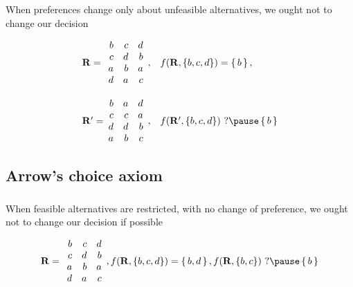 \documentclass[french,english]{beamer}
\begin{document}
\begin{frame}[fragile]
	\frametitle{\subsecname}
	\begin{definition}[\subsecname]
		When preferences change only about unfeasible alternatives, we ought not to change our decision
	\end{definition}
	\vspace{-1.8pt}
	\begin{example}
		\begin{equation}
			\begin{array}{l@{\hskip 0in}ll}
				\prof =
				&\begin{array}{rrr}
					b	&	c	&	d\\
					c	&	d	&	b\\
					a	&	b	&	a\\
					d	&	a	&	c
				\end{array},
				& f(\prof, \{b, c, d\}) = \set{b},\\[3em]
				\prof' =
				&\begin{array}{rrr}
					b	&	a	&	d\\
					c	&	c	&	a\\
					d	&	d	&	b\\
					a	&	b	&	c
				\end{array},
				& f(\prof', \{b, c, d\})\text{ ?}
				\pause
				\set{b}
			\end{array}
		\end{equation}
	\end{example}
\end{frame}

\subsection[ACA]{Arrow’s choice axiom}
\begin{frame}
	\frametitle{\subsecname}
	\begin{definition}[\subsecname]
		When feasible alternatives are restricted, with no change of preference, we ought not to change our decision if possible
	\end{definition}
	\vspace{-1.8pt}
	\begin{example}
		\begin{equation}
			\prof =
			\begin{array}{rrr}
				b	&	c	&	d\\
				c	&	d	&	b\\
				a	&	b	&	a\\
				d	&	a	&	c
			\end{array},
			f(\prof, \{b, c, d\}) = \set{b, d},
			f(\prof, \{b, c\})\text{ ?}
			\pause
			\set{b}
		\end{equation}
	\end{example}
\end{frame}
\end{document}
